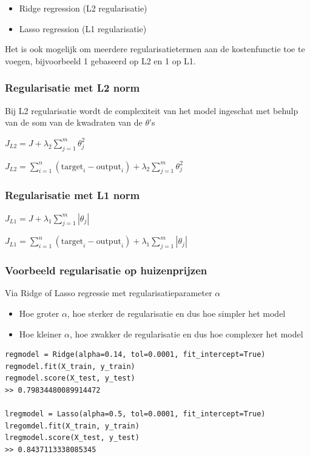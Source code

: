 \documentclass{article}
\begin{document}
\begin{itemize}
    \item Ridge regression (L2 regularisatie)
    \item Lasso regression (L1 regularisatie)
\end{itemize}

Het is ook mogelijk om meerdere regularisatietermen aan de kostenfunctie toe te voegen, 
bijvoorbeeld 1 gebaseerd op L2 en 1 op L1.

\subsubsection{Regularisatie met L2 norm}

Bij L2 regularisatie wordt de complexiteit van het model ingeschat met behulp van de som 
van de kwadraten van de $\theta$'s 

\begin{center}
$J_{L2} = J + \lambda_2 \sum_{j=1}^m \theta_j^2$

$J_{L2} = \sum_{i=1}^n (\text{target}_i - \text{output}_i) + \lambda_2 \sum_{j=1}^m \theta_j^2$
\end{center}


\subsubsection{Regularisatie met L1 norm}

\begin{center}
$J_{L1} = J + \lambda_1 \sum_{j=1}^m |\theta_j|$

$J_{L1} = \sum_{i=1}^n (\text{target}_i - \text{output}_i) + \lambda_1 \sum_{j=1}^m |\theta_j|$
\end{center}


\subsubsection{Voorbeeld regularisatie op huizenprijzen}

Via Ridge of Lasso regressie met regularisatieparameter $\alpha$

\begin{itemize}
    \item Hoe groter $\alpha$, hoe sterker de regularisatie en dus hoe simpler het model
    \item Hoe kleiner $\alpha$, hoe zwakker de regularisatie en dus hoe complexer het model
\end{itemize}

\begin{verbatim}
regmodel = Ridge(alpha=0.14, tol=0.0001, fit_intercept=True)
regmodel.fit(X_train, y_train)
regmodel.score(X_test, y_test)
>> 0.79834480089914472

lregmodel = Lasso(alpha=0.5, tol=0.0001, fit_intercept=True)
lregomdel.fit(X_train, y_train)
lregmodel.score(X_test, y_test)
>> 0.8437113338085345
\end{verbatim}
\end{document}
